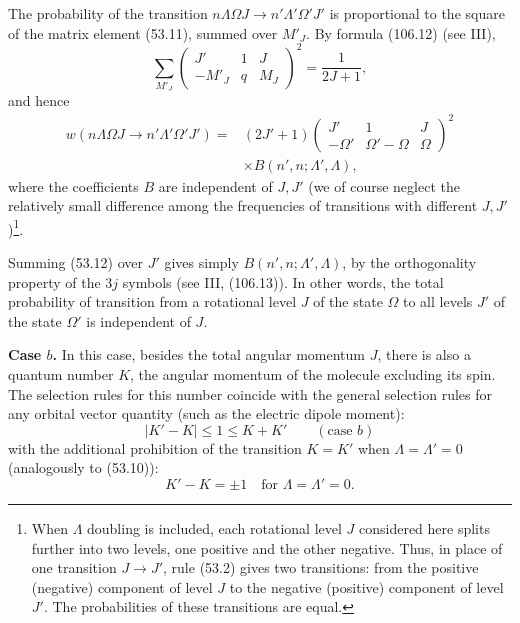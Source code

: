 The probability of the transition $n\Lambda\Omega J\to n'\Lambda'\Omega'J'$ is proportional to the square of the matrix element (53.11), summed over $M'_J$. By formula (106.12) (see III),
\[
\sum_{M'_J}\begin{pmatrix}J'&1&J\\-M'_J&q&M_J\end{pmatrix}^{\!2}=\frac1{2J+1},
\]
and hence
\begin{equation}
\begin{aligned}
w(n\Lambda\Omega J\to n'\Lambda'\Omega'J')={}&(2J'+1)
\begin{pmatrix}J'&1&J\\-\Omega'&\Omega'-\Omega&\Omega\end{pmatrix}^{\!2}\\
&\times B(n',n;\Lambda',\Lambda),
\end{aligned}
\tag{53.12}
\end{equation}
where the coefficients $B$ are independent of $J,J'$ (we of course neglect the relatively small difference among the frequencies of transitions with different $J,J'$)\footnote{When $\Lambda$ doubling is included, each rotational level $J$ considered here splits further into two levels, one positive and the other negative. Thus, in place of one transition $J\to J'$, rule (53.2) gives two transitions: from the positive (negative) component of level $J$ to the negative (positive) component of level $J'$. The probabilities of these transitions are equal.}.

Summing (53.12) over $J'$ gives simply $B(n',n;\Lambda',\Lambda)$, by the orthogonality property of the $3j$ symbols (see III, (106.13)). In other words, the total probability of transition from a rotational level $J$ of the state $\Omega$ to all levels $J'$ of the state $\Omega'$ is independent of $J$.

\textbf{Case $b$.} In this case, besides the total angular momentum $J$, there is also a quantum number $K$, the angular momentum of the molecule excluding its spin. The selection rules for this number coincide with the general selection rules for any orbital vector quantity (such as the electric dipole moment):
\begin{equation}
|K'-K|\leq1\leq K+K'\qquad(\text{case }b)
\tag{53.13}
\end{equation}
with the additional prohibition of the transition $K=K'$ when $\Lambda=\Lambda'=0$ (analogously to (53.10)):
\begin{equation}
K'-K=\pm1\quad\text{for }\Lambda=\Lambda'=0.
\tag{53.14}
\end{equation}

